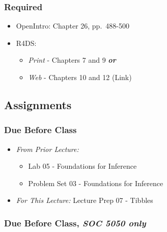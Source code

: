 \documentclass[]{book}
\providecommand{\tightlist}{%
  \setlength{\itemsep}{0pt}\setlength{\parskip}{0pt}}
\theoremstyle{definition}
\theoremstyle{definition}
\theoremstyle{definition}
\theoremstyle{remark}
\begin{document}
\hypertarget{required-8}{%
\subsubsection*{Required}\label{required-8}}

\begin{itemize}
\tightlist
\item
  OpenIntro: Chapter 26, pp.~488-500
\item
  R4DS:

  \begin{itemize}
  \tightlist
  \item
    \emph{Print} - Chapters 7 and 9 \textbf{\emph{or}}
  \item
    \emph{Web} - Chapters 10 and 12 (Link)
  \end{itemize}
\end{itemize}

\hypertarget{assignments-8}{%
\subsection*{Assignments}\label{assignments-8}}

\hypertarget{due-before-class-6}{%
\subsubsection*{Due Before Class}\label{due-before-class-6}}

\begin{itemize}
\tightlist
\item
  \emph{From Prior Lecture:}

  \begin{itemize}
  \tightlist
  \item
    Lab 05 - Foundations for Inference
  \item
    Problem Set 03 - Foundations for Inference
  \end{itemize}
\item
  \emph{For This Lecture:} Lecture Prep 07 - Tibbles
\end{itemize}

\hypertarget{due-before-class-soc-5050-only}{%
\subsubsection*{\texorpdfstring{Due Before Class, \emph{SOC 5050
only}}{Due Before Class, SOC 5050 only}}\label{due-before-class-soc-5050-only}}
\end{document}
